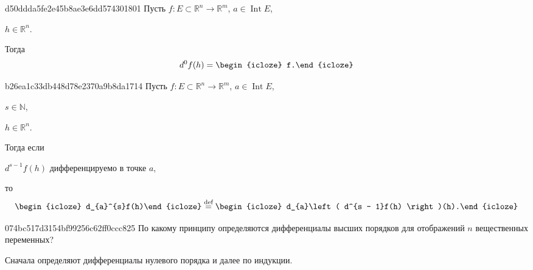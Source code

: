 \begin{note}{d50ddda5fe2e45b8ae3e6dd574301801}
    Пусть \({ f : E \subset \mathbb R^{n} \to \mathbb R^{m} }\),\: \({ a \in \operatorname{Int} E }\),\: \begin{icloze}{2}\({ h \in \mathbb R^{n} }\).\end{icloze}
    Тогда
    \[
        d^{0}f(h) = \begin{icloze}{1}f.\end{icloze}
    \]
\end{note}

\begin{note}{b26ea1c33db448d78e2370a9b8da1714}
    Пусть \({ f : E \subset \mathbb R^{n} \to \mathbb R^{m} }\),\: \({ a \in \operatorname{Int} E }\),\: \begin{icloze}{5}\({ s \in \mathbb N }\),\end{icloze}\: \begin{icloze}{4}\({ h \in \mathbb R^{n} }\).\end{icloze}
    Тогда если \begin{icloze}{2}\({ d^{s - 1}f(h) }\) дифференцируемо в точке \({ a }\),\end{icloze} то
    \[
        \begin{icloze}{3}d_{a}^{s}f(h)\end{icloze} \overset{\text{def}}= \begin{icloze}{1}d_{a}\left( d^{s - 1}f(h) \right)(h).\end{icloze}
    \]
\end{note}

\begin{note}{074bc517d3154bf99256c62ff0ccc825}
    По какому принципу определяются дифференциалы высших порядков для отображений \({ n }\) вещественных переменных?

    \begin{cloze}{1}
        Сначала определяют дифференциалы нулевого порядка и далее по индукции.
    \end{cloze}
\end{note}


